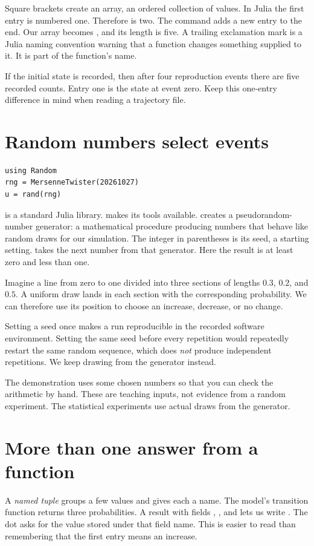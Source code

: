 Square brackets create an array, an ordered collection of values. In Julia the first entry is numbered one. Therefore  is two. The command  adds a new entry to the end. Our array becomes \code{[2, 3, 3, 2, 1]}, and its length is five. A trailing exclamation mark is a Julia naming convention warning that a function changes something supplied to it. It is part of the function's name.

If the initial state is recorded, then after four reproduction events there are five recorded counts. Entry one is the state at event zero. Keep this one-entry difference in mind when reading a trajectory file.

\section{Random numbers select events}
\begin{lstlisting}
using Random
rng = MersenneTwister(20261027)
u = rand(rng)
\end{lstlisting}

 is a standard Julia library.  makes its tools available.  creates a pseudorandom-number generator: a mathematical procedure producing numbers that behave like random draws for our simulation. The integer in parentheses is its seed, a starting setting.  takes the next number from that generator. Here the result is at least zero and less than one.

Imagine a line from zero to one divided into three sections of lengths \(0.3\), \(0.2\), and \(0.5\). A uniform draw lands in each section with the corresponding probability. We can therefore use its position to choose an increase, decrease, or no change.

Setting a seed once makes a run reproducible in the recorded software environment. Setting the same seed before every repetition would repeatedly restart the same random sequence, which does \emph{not} produce independent repetitions. We keep drawing from the generator instead.

The demonstration uses some chosen numbers so that you can check the arithmetic by hand. These are teaching inputs, not evidence from a random experiment. The statistical experiments use actual draws from the generator.

\section{More than one answer from a function}
A \emph{named tuple} groups a few values and gives each a name. The model's transition function returns three probabilities. A result with fields , , and  lets us write . The dot asks for the value stored under that field name. This is easier to read than remembering that the first entry means an increase.

